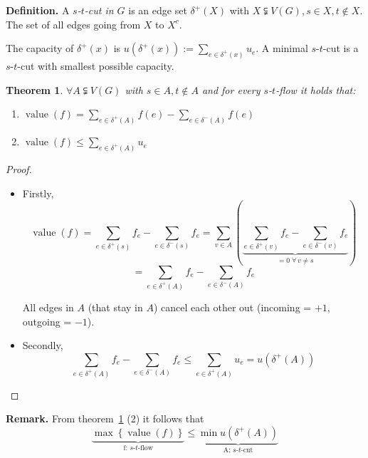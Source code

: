 \documentclass{article}
\newtheorem{theorem}{Theorem}
\newcommand{\set}[1]{\left\{#1\right\}}
\newcommand{\flow}[2]{$#1$-$#2$-flow}
\newcommand{\fall}{\;\forall\,}
\begin{document}
\textbf{Definition.}
  A \emph{$s$-$t$-cut in $G$} is an edge set $\delta^+(X)$ with $X \subsetneqq V(G), s \in X, t \notin X$. The set of all edges going from $X$ to $X^c$.

The capacity of $\delta^+(x)$ is $u(\delta^+(x)) := \sum_{e \in \delta^+(x)} u_e$.
A minimal $s$-$t$-cut is a $s$-$t$-cut with smallest possible capacity.

\begin{theorem}
  \label{lemma-4.2}
  $\forall A \subsetneqq V(G)$ with $s \in A, t \notin A$ and for every $s$-$t$-flow it holds that:
  \begin{enumerate}
    \item $\operatorname{value}{(f)} = \sum_{e \in \delta^+(A)} f(e) - \sum_{e \in \delta^-(A)} f(e)$
    \item $\operatorname{value}{(f)} \leq \sum_{e \in \delta^+(A)} u_e$
  \end{enumerate}
\end{theorem}

\begin{proof}
  \begin{itemize}
    \item Firstly, \[
        \operatorname{value}(f)
        = \sum_{e \in \delta^+(s)} f_e - \sum_{e \in \delta^-(s)} f_e
        = \sum_{v \in A} \left(
          \underbrace{\sum_{e \in \delta^+(v)} f_e - \sum_{e \in \delta^-(v)} f_e}%
            _{= 0 \fall v \neq s}
        \right)
      \] \[
        = \sum_{e \in \delta^+(A)} f_e - \sum_{e \in \delta^-(A)} f_e
      \]

      All edges in $A$ (that stay in $A$) cancel each other out
      (incoming = $+1$, outgoing = $-1$).
    \item Secondly, \[
      \sum_{e \in \delta^+(A)} f_e - \sum_{e \in \delta^-(A)} f_e
      \leq \sum_{e \in \delta^+(A)} u_e
      = u(\delta^+(A))
    \]
  \end{itemize}
\end{proof}

\textbf{Remark.}
  From theorem~\ref{lemma-4.2} (2) it follows that
  \[
    \underbrace{\max\set{\operatorname{value}(f)}}_{\text{f: \flow st}} \leq
    \underbrace{\min{u(\delta^+(A))}}_{\text{A: $s$-$t$-cut}}
  \]
\end{document}
